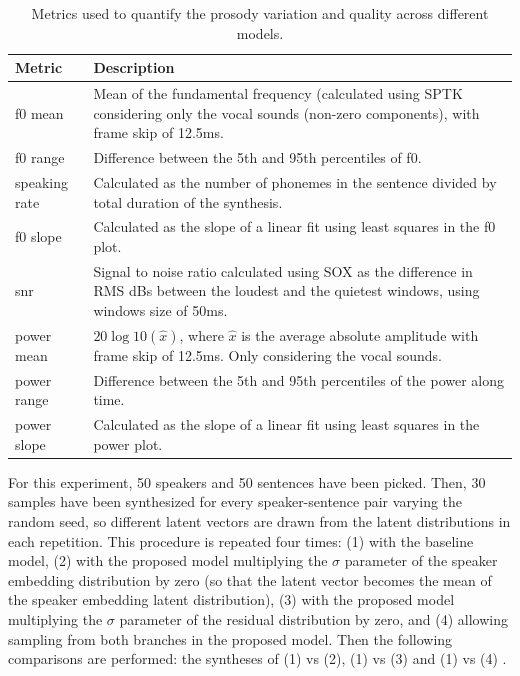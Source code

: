 \begin{table}[h!]
	\scriptsize
		\centering
	\caption[Summary of prosody variability metrics for TTS models]{Metrics used to quantify the prosody variation and quality across different models.}
	\begin{tabular}{p{}|p{}}
		\toprule
		Metric & Description \\
		\midrule
		f0 mean &  Mean of the fundamental frequency (calculated using SPTK \autocite{sptk} considering only the vocal sounds (non-zero components), with frame skip of 12.5ms.\\
		f0 range & Difference between the 5th and 95th percentiles of f0. \\
		speaking rate & Calculated as the number of phonemes in the sentence divided by total duration of the synthesis. \\
		f0 slope & Calculated as the slope of a linear fit using least squares in the f0 plot. \\
		snr & Signal to noise ratio calculated using SOX \autocite{SOX} as the difference in RMS dBs between the loudest and the quietest windows, using windows size of 50ms. \\
		power mean & $20\log10(\hat{x})$, where $\hat{x}$ is the average absolute amplitude with frame skip of 12.5ms. Only considering the vocal sounds. \\
		power range & Difference between the 5th and 95th percentiles of the power along time. \\
		power slope & Calculated as the slope of a linear fit using least squares in the power plot. \\
		\bottomrule
	\end{tabular}
	\label{tab:metrics}
\end{table}



For this experiment, 50 speakers and 50 sentences have been picked. Then, 30 samples have been synthesized for every speaker-sentence pair varying the random seed, so different latent vectors are drawn from the latent distributions in each repetition. This procedure is repeated four times: (1) with the baseline model, (2) with the proposed model multiplying the $\sigma$ parameter of the speaker embedding distribution by zero (so that the latent vector becomes the mean of the speaker embedding latent distribution), (3) with the proposed model multiplying the $\sigma$ parameter of the residual distribution by zero, and (4) allowing sampling from both branches in the proposed model. Then the following comparisons are performed: the syntheses of (1) vs (2), (1) vs (3) and (1) vs (4) .

